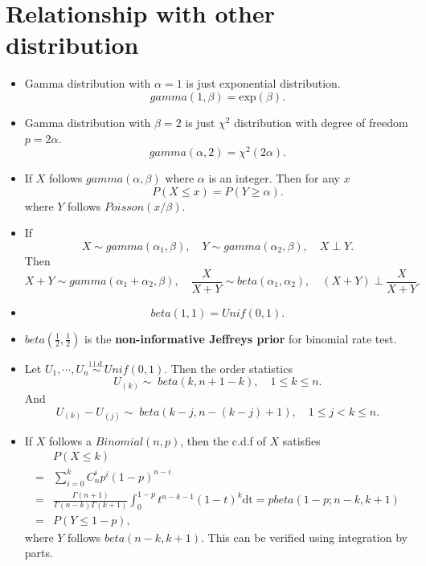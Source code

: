 \documentclass[a4paper,12pt]{article}
\begin{document}
\section{Relationship with other distribution}
\label{sec:relat-other-distr}

\begin{itemize}
\item Gamma distribution with $\alpha = 1$ is just exponential distribution.
  \[
    gamma\left(1, \beta\right) = \mathrm{exp}\left(\beta\right)
    .
  \]
  
\item Gamma distribution with $\beta = 2$ is just $\chi^2$ distribution with degree of freedom $p = 2\alpha$.
  \[
    gamma\left(\alpha, 2\right) = \chi^2\left(2\alpha\right)
    .
  \]
  
\item If $X$ follows $gamma\left(\alpha, \beta\right)$ where $\alpha$ is an integer. Then for any $x$
  \[
    P\left(X \leq x\right) = P\left(Y \geq \alpha\right)
    .
  \]
  where $Y$ follows $Poisson\left(x / \beta\right)$.
  
\item If
  \[
    X \sim gamma\left(\alpha_1, \beta\right)
    ,\quad
    Y \sim gamma\left(\alpha_2, \beta\right)
    ,\quad
    X \perp Y
    .
  \]
  Then
  \[
    X + Y \sim gamma\left(\alpha_1 + \alpha_2, \beta\right)
    ,\quad
    \frac{X}{X + Y} \sim beta\left(\alpha_1, \alpha_2\right)
    ,\quad
    \left(X + Y\right) \perp \frac{X}{X + Y}
    .
  \]
\item
  \[
    beta\left(1, 1\right) = Unif\left(0, 1\right)
    .
  \]
  
\item $beta\left(\frac{1}{2}, \frac{1}{2}\right)$ is the \textbf{non-informative Jeffreys prior} for binomial rate test.
  
\item Let $U_1, \cdots, U_n \overset{\mathrm{i.i.d.}}{\sim} Unif(0, 1)$. Then the order statistics
  \[
    U_{\left(k\right)} \sim\; beta\left(k, n + 1 - k\right)
    ,\quad
    1\leq k \leq n
    .
  \]
  And
  \[
    U_{\left(k\right)} - U_{\left(j\right)}
    \sim\; beta\left(k - j, n - \left(k - j\right) + 1\right)
    ,\quad
    1 \leq j < k \leq n
    .
  \]
  
\item If $X$ follows a $Binomial(n, p)$, then the c.d.f of $X$ satisfies
  \[
    \begin{aligned}
      & P\left(X \leq k\right)    \\
      =& \sum\limits_{i = 0}^kC_{n}^ip^i\left(1 - p\right)^{n - i}    \\
      =& \frac{
        \Gamma\left(n + 1\right)
      }{
        \Gamma\left(n - k\right)\Gamma\left(k + 1\right)
      }
      \int_0^{1 - p}t^{n - k - 1}\left(1 - t\right)^k\mathrm{dt}
      = pbeta\left(1 - p; n-k, k + 1\right)    \\
      =& P\left(Y \leq 1 - p\right)
      ,
    \end{aligned}
  \]
  where $Y$ follows $beta\left(n - k, k + 1\right)$. This can be verified using integration by parts.
\end{itemize}



\end{document}
